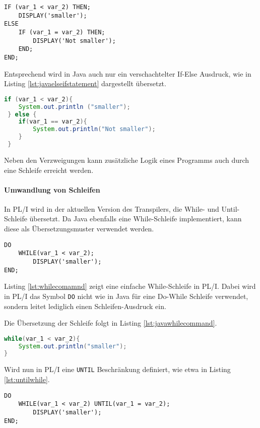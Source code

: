 \begin{lstlisting}[language=PL/I, caption=PL/I IF-ELSE Statement, label={lst:pliifelsestatement}]
IF (var_1 < var_2) THEN;
	DISPLAY('smaller');
ELSE
	IF (var_1 = var_2) THEN;
		DISPLAY('Not smaller');
	END;
END;
\end{lstlisting} 
 
 Entsprechend wird in Java auch nur ein verschachtelter If-Else Ausdruck, wie in Listing \ref{lst:javaelseifstatement} dargestellt übersetzt.
 
 \begin{lstlisting}[language=Java, caption=Java If-Else Statement, label={lst:javaelseifstatement}]
 if (var_1 < var_2){
 	System.out.println ("smaller");
 } else {
 	if(var_1 == var_2){
 		System.out.println("Not smaller");
 	}
 }
 \end{lstlisting} 

Neben den Verzweigungen kann zusätzliche Logik eines Programms auch durch eine Schleife erreicht werden.

\paragraph{Umwandlung von Schleifen}
In PL/I wird in der aktuellen Version des Transpilers, die  While- und Until-Schleife übersetzt.
Da Java ebenfalls eine While-Schleife implementiert, kann diese als Übersetzungsmuster verwendet werden.

\begin{lstlisting}[language=PL/I, caption=PL/I IF-Else Statement, label={lst:whilecomamnd}]
DO 
	WHILE(var_1 < var_2);
		DISPLAY('smaller');
END;
\end{lstlisting} 

Listing \ref{lst:whilecomamnd} zeigt eine einfache While-Schleife in PL/I.
Dabei wird in PL/I das Symbol \verb+DO+ nicht wie in Java für eine Do-While
Schleife verwendet, sondern leitet lediglich einen Schleifen-Ausdruck ein.

Die Übersetzung der Schleife folgt in Listing \ref{lst:javawhilecommand}.

\begin{lstlisting}[language=Java, caption=Java While-Statement, label={lst:javawhilecommand}]
while(var_1 < var_2){
	System.out.println("smaller");
}
\end{lstlisting} 

Wird nun in PL/I eine \verb+UNTIL+ Beschränkung definiert, wie etwa in Listing
\ref{lst:untilwhile}.

\begin{lstlisting}[language=PL/I, caption=PL/I IF-ELSE Statement, label={lst:untilwhile}]
DO 
	WHILE(var_1 < var_2) UNTIL(var_1 = var_2);
		DISPLAY('smaller');
END;
\end{lstlisting} 

